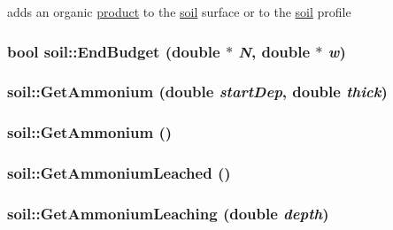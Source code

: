 adds an organic \hyperlink{classproduct}{product} to the \hyperlink{classsoil}{soil} surface or to the \hyperlink{classsoil}{soil} profile \hypertarget{classsoil_a8689520502e8522ac581ed1f4ed2a8a5}{
\subsubsection[{EndBudget}]{\setlength{\rightskip}{0pt plus 5cm}bool soil::EndBudget (double $\ast$ {\em N}, \/  double $\ast$ {\em w})}}
\label{classsoil_a8689520502e8522ac581ed1f4ed2a8a5}
\hypertarget{classsoil_a78fed3554b176494a3e703dae8e8b31a}{
\subsubsection[{GetAmmonium}]{ soil::GetAmmonium (double {\em startDep}, \/  double {\em thick})}}
\label{classsoil_a78fed3554b176494a3e703dae8e8b31a}
\hypertarget{classsoil_a103bd1bc57f62e9294194274c46ff7ef}{
\subsubsection[{GetAmmonium}]{ soil::GetAmmonium ()}}
\label{classsoil_a103bd1bc57f62e9294194274c46ff7ef}
\hypertarget{classsoil_a8320c94a76f8221bdfb6edf11f586fa6}{
\subsubsection[{GetAmmoniumLeached}]{ soil::GetAmmoniumLeached ()}}
\label{classsoil_a8320c94a76f8221bdfb6edf11f586fa6}
\hypertarget{classsoil_a4ed6d8238db0cde0c7ceb073ec61fe83}{
\subsubsection[{GetAmmoniumLeaching}]{ soil::GetAmmoniumLeaching (double {\em depth})}}
